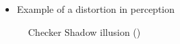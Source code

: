 \documentclass[
  ignorenonframetext,
]{beamer}
\providecommand{\tightlist}{%
  \setlength{\itemsep}{0pt}\setlength{\parskip}{0pt}}\usepackage{longtable,booktabs,array}
\begin{document}
\begin{frame}{}
\label{section-3}
\begin{itemize}
\tightlist
\item
  Example of a distortion in perception
\end{itemize}

\begin{figure}


\caption{\label{fig-checker-shadow-illusion}Checker Shadow illusion
()}

\end{figure}%
\end{frame}
\end{document}
